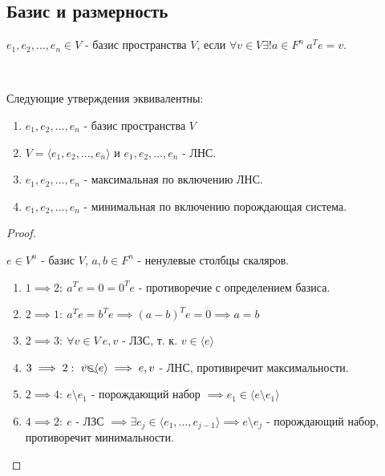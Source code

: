 \subsection{Базис и размерность}

\begin{defn}
    $e_1, e_2, \ldots, e_n \in V$ - базис пространства $V$, если $\forall v \in V \exists! a \in F^n ~ a^Te = v$.
\end{defn}


\begin{theorem}~
    

    Следующие утверждения эквивалентны:
    \begin{enumerate}
        \item $e_1, e_2, \ldots, e_n$ - базис пространства $V$
        \item $V = \langle e_1, e_2, \ldots, e_n \rangle$ и $e_1, e_2, \ldots, e_n$ - ЛНС.
        \item $e_1, e_2, \ldots, e_n$ - максимальная по включению ЛНС.
        \item $e_1, e_2, \ldots, e_n$ - минимальная по включению порождающая система.
    \end{enumerate}
\end{theorem}

\begin{proof}~

    $e \in V^n$ - базис $V$, $a, b \in F^n$ - ненулевые столбцы скаляров.
    \begin{enumerate}
        

        \item $1 \implies 2: ~ a^T e = 0 = 0^T e$ - противоречие с определением базиса. 
        \item $2 \implies 1: ~ a^T e = b^T e \implies (a-b)^Te = 0 \implies a = b$
        \item $2 \implies 3: ~ \forall v \in V ~ e, v$ - ЛЗС,  т. к. $v \in \langle e \rangle$
        \item $3 \implies 2: ~ v \bcancel{\in} \langle e \rangle \implies e, v$ - ЛНС, противиречит максимальности.
        \item $2 \implies 4: ~ e \setminus e_1$ - порождающий набор $\implies e_1 \in \langle e \setminus e_1 \rangle$
        \item $4 \implies 2: ~ e$ - ЛЗС $\implies \exists e_j \in \langle e_1, \ldots, e_{j-1} \rangle \implies e \setminus e_j$ - порождающий набор, противоречит минимальности.
    \end{enumerate}
\end{proof}

